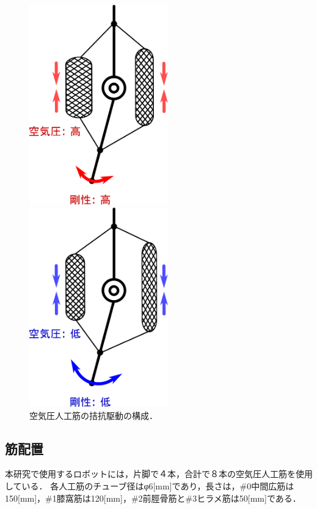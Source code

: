 \begin{figure}[htbp]
 \begin{minipage}[b]{.5\linewidth}
 \centering
 \includegraphics[width = 6.0cm, clip]{./fig/pair_high.png}
 \end{minipage}
 \begin{minipage}[b]{.5\linewidth}
 \centering
 \includegraphics[width = 6.0cm,clip]{./fig/pair_low.png}
 \end{minipage}
 \caption{空気圧人工筋の拮抗駆動の構成．\label{stiffness}}
\end{figure}


\subsection{筋配置}
本研究で使用するロボットには，片脚で４本，合計で８本の空気圧人工筋を使用している．
各人工筋のチューブ径はφ6[mm]であり，長さは，\#0中間広筋は150[mm]，\#1膝窩筋は120[mm]，\#2前脛骨筋と\#3ヒラメ筋は50[mm]である．

